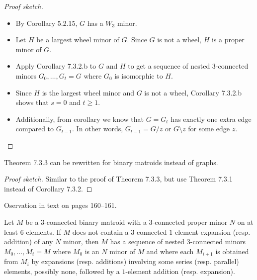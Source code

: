 \begin{proof}[Proof sketch]
  \begin{itemize}
    \item By Corollary 5.2.15, $G$ has a $W_{3}$ minor.
    \item Let $H$ be a largest wheel minor of $G$. Since $G$ is not a wheel, $H$ is a proper minor of $G$.
    \item Apply Corollary 7.3.2.b to $G$ and $H$ to get a sequence of nested $3$-connected minors $G_{0}, \dots, G_{t} = G$ where $G_{0}$ is isomorphic to $H$.
    \item Since $H$ is the largest wheel minor and $G$ is not a wheel, Corollary 7.3.2.b shows that $s = 0$ and $t \geq 1$.
    \item Additionally, from corollary we know that $G = G_{t}$ has exactly one extra edge compared to $G_{t - 1}$. In other words, $G_{t - 1} = G / z$ or $G \setminus z$ for some edge $z$.
  \end{itemize}
\end{proof}

\begin{theorem}
  \label{thm:7.3.3.binary}
  Theorem 7.3.3 can be rewritten for binary matroids instead of graphs.
\end{theorem}

\begin{proof}[Proof sketch]
  Similar to the proof of Theorem 7.3.3, but use Theorem 7.3.1 instead of Corollary 7.3.2.
\end{proof}

\begin{proposition}[7.3.4.observation]
  \label{prop:7.3.4.obs}
  Oservation in text on pages 160--161.
\end{proposition}

\begin{theorem}[7.3.4]
  \label{thm:7.3.4}
  Let $M$ be a $3$-connected binary matroid with a $3$-connected proper minor $N$ on at least $6$ elements. If $M$ does not contain a $3$-connected $1$-element expansion (resp. addition) of any $N$ minor, then $M$ has a sequence of nested $3$-connected minors $M_{0}, \dots, M_{t} = M$ where $M_{0}$ is an $N$ minor of $M$ and where each $M_{i + 1}$ is obtained from $M_{i}$ by expansions (resp. additions) involving some series (resp. parallel) elements, possibly none, followed by a $1$-element addition (resp. expansion).
\end{theorem}

